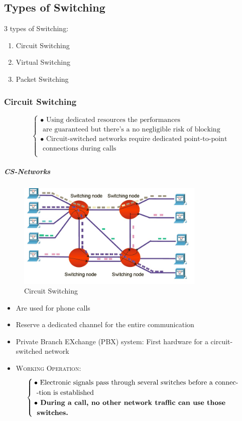 \subsection{Types of Switching}
3 types of Switching:
\begin{enumerate}
\item Circuit Switching
\item Virtual Switching
\item Packet Switching 
\end{enumerate}

\subsubsection{Circuit Switching}
\begin{equation}
\begin{cases}
\bullet \text{ Using dedicated resources the performances} \\ \text{ are guaranteed but there's a no negligible risk of blocking}\\
\bullet \text{ Circuit-switched networks require dedicated point-to-point}\\ \text{ connections during calls}\\
\end{cases}
\end{equation}

\subparagraph{CS-Networks}
\begin{figure}
\centering
\includegraphics[width=0.8\textwidth]{CS.jpg}
\caption{\label{CS.jpg}Circuit Switching}
\end{figure}

\begin{itemize}
\item Are used for phone calls
\item Reserve a dedicated channel for the entire communication
\item Private Branch EXchange (PBX) system: First hardware for a circuit-switched network 
\item \textsc{Working Operation:} 
\begin{equation}
\begin{cases}
\bullet \text{ Electronic signals pass through several switches before a connec-}\\ \text{ -tion is established}\\
\bullet \text{\textbf{ During a call, no other network traffic can use those}} \\ \text{\textbf{ switches.}}
\end{cases}
\end{equation}
\end{itemize}


